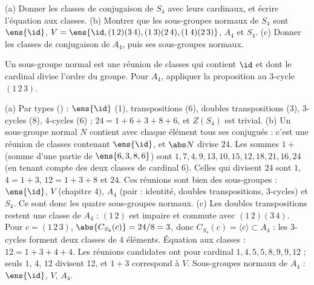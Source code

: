 \begin{exo}
\begin{corrige}
\end{corrige}
\end{exo}

\begin{exo}\label{exo-classes-s4}
(a) Donner les classes de conjugaison de $S_4$ avec leurs cardinaux, et écrire l'équation aux classes. (b) Montrer que les sous-groupes normaux de $S_4$ sont $\ens{\id}$, $V=\ens{\id,(1\,2)(3\,4),(1\,3)(2\,4),(1\,4)(2\,3)}$, $A_4$ et $S_4$. (c) Donner les classes de conjugaison de $A_4$, puis ses sous-groupes normaux.
\begin{indication}
Un sous-groupe normal est une réunion de classes qui contient $\id$ et dont le cardinal divise l'ordre du groupe. Pour $A_4$, appliquer la proposition  au 3-cycle $(1\,2\,3)$.
\end{indication}
\begin{corrige}
(a) Par types () : $\ens{\id}$ (1), transpositions (6), doubles transpositions (3), 3-cycles (8), 4-cycles (6) ; $24=1+6+3+8+6$, et $Z(S_4)$ est trivial.
(b) Un sous-groupe normal $N$ contient avec chaque élément tous ses conjugués : c'est une réunion de classes contenant $\ens{\id}$, et $\abs N$ divise $24$. Les sommes $1+$(somme d'une partie de $\ens{6,3,8,6}$) sont $1,7,4,9,13,10,15,12,18,21,16,24$ (en tenant compte des deux classes de cardinal 6). Celles qui divisent 24 sont $1$, $4=1+3$, $12=1+3+8$ et $24$. Ces réunions sont bien des sous-groupes : $\ens{\id}$, $V$ (chapitre 4), $A_4$ (pair : identité, doubles transpositions, 3-cycles) et $S_4$. Ce sont donc les quatre sous-groupes normaux.
(c) Les doubles transpositions restent une classe de $A_4$ : $(1\,2)$ est impaire et commute avec $(1\,2)(3\,4)$. Pour $c=(1\,2\,3)$, $\abs{C_{S_4}(c)}=24/8=3$, donc $C_{S_4}(c)=\langle c\rangle\subset A_4$ : les 3-cycles forment deux classes de 4 éléments. Équation aux classes : $12=1+3+4+4$. Les réunions candidates ont pour cardinal $1,4,5,5,8,9,9,12$ ; seuls $1$, $4$, $12$ divisent 12, et $1+3$ correspond à $V$. Sous-groupes normaux de $A_4$ : $\ens{\id}$, $V$, $A_4$.
\end{corrige}
\end{exo}

